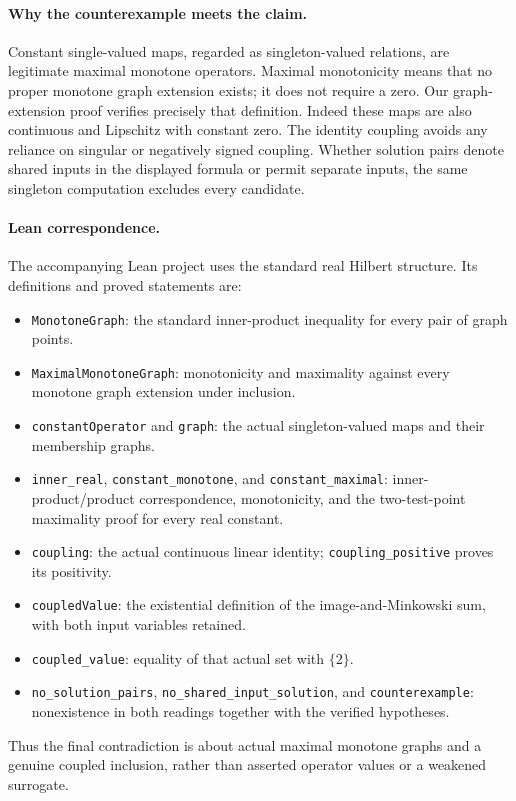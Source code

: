 \documentclass[11pt]{article}
\begin{document}
\paragraph{Why the counterexample meets the claim.}
Constant single-valued maps, regarded as singleton-valued relations, are legitimate maximal monotone operators. Maximal monotonicity means that no proper monotone graph extension exists; it does not require a zero. Our graph-extension proof verifies precisely that definition. Indeed these maps are also continuous and Lipschitz with constant zero. The identity coupling avoids any reliance on singular or negatively signed coupling. Whether solution pairs denote shared inputs in the displayed formula or permit separate inputs, the same singleton computation excludes every candidate.

\paragraph{Lean correspondence.}
The accompanying Lean project uses the standard real Hilbert structure.
Its definitions and proved statements are:
\begin{itemize}
\item \texttt{MonotoneGraph}: the standard inner-product inequality for every pair of graph points.
\item \texttt{MaximalMonotoneGraph}: monotonicity and maximality against every monotone graph extension under inclusion.
\item \texttt{constantOperator} and \texttt{graph}: the actual singleton-valued maps and their membership graphs.
\item \texttt{inner\_real}, \texttt{constant\_monotone}, and \texttt{constant\_maximal}: inner-product/product correspondence, monotonicity, and the two-test-point maximality proof for every real constant.
\item \texttt{coupling}: the actual continuous linear identity; \texttt{coupling\_positive} proves its positivity.
\item \texttt{coupledValue}: the existential definition of the image-and-Minkowski sum, with both input variables retained.
\item \texttt{coupled\_value}: equality of that actual set with \(\{2\}\).
\item \texttt{no\_solution\_pairs}, \texttt{no\_shared\_input\_solution}, and \texttt{counterexample}: nonexistence in both readings together with the verified hypotheses.
\end{itemize}
Thus the final contradiction is about actual maximal monotone graphs and a genuine coupled inclusion, rather than asserted operator values or a weakened surrogate.
\end{document}
